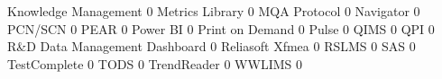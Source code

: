 \documentclass{article}
\begin{document}
\begin{Schunk}
\begin{Soutput}
  Knowledge Management                                                        0
  Metrics Library                                                             0
  MQA Protocol                                                                0
  Navigator                                                                   0
  PCN/SCN                                                                     0
  PEAR                                                                        0
  Power BI                                                                    0
  Print on Demand                                                             0
  Pulse                                                                       0
  QIMS                                                                        0
  QPI                                                                         0
  R&D Data Management Dashboard                                               0
  Reliasoft Xfmea                                                             0
  RSLMS                                                                       0
  SAS                                                                         0
  TestComplete                                                                0
  TODS                                                                        0
  TrendReader                                                                 0
  WWLIMS                                                                      0
                                                           

\end{Soutput}
\end{Schunk}
\end{document}
